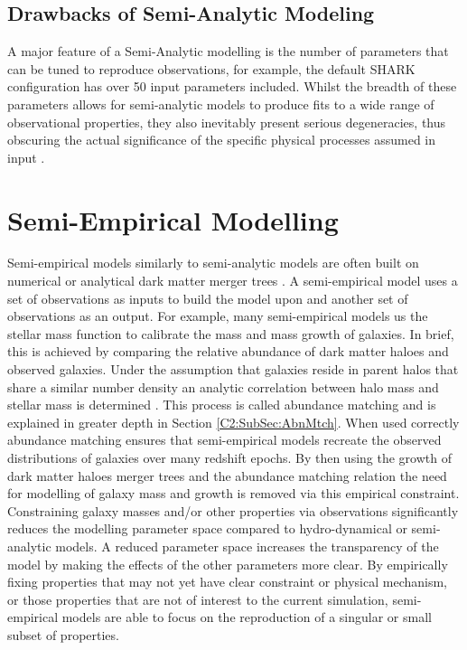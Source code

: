 \subsection{Drawbacks of Semi-Analytic Modeling}
A major feature of a Semi-Analytic modelling is the number of parameters that can be tuned to reproduce observations, for example, the default SHARK configuration has over 50 input parameters included. Whilst the breadth of these parameters allows for semi-analytic models to produce fits to a wide range of observational properties, they also inevitably present serious degeneracies, thus obscuring the actual significance of the specific physical processes assumed in input \citep{Lapi2011DarkModels,Gonzalez2011Evolution4}.


\section{Semi-Empirical Modelling}
\label{sec:SEM}
Semi-empirical models similarly to semi-analytic models are often built on numerical or analytical dark matter merger trees \cite{Zavala2012}. A semi-empirical model uses a set of observations as inputs to build the model upon and another set of observations as an output. 
For example, many semi-empirical models us the stellar mass function to calibrate the mass and mass growth of galaxies. In brief, this is achieved by comparing the relative abundance of dark matter haloes and observed galaxies. Under the assumption that galaxies reside in parent halos that share a similar number density an analytic correlation between halo mass and stellar mass is determined \citep{Kravtsov2004TheDistribution,Shankar2006NewFormation}. This process is called abundance matching and is explained in greater depth in Section \ref{C2:SubSec:AbnMtch}. When used correctly abundance matching ensures that semi-empirical models recreate the observed distributions of galaxies over many redshift epochs. By then using the growth of dark matter haloes merger trees and the abundance matching relation the need for modelling of galaxy mass and growth is removed via this empirical constraint. Constraining galaxy masses and/or other properties via observations significantly reduces the modelling parameter space compared to hydro-dynamical or semi-analytic models. A reduced parameter space increases the transparency of the model by making the effects of the other parameters more clear. By empirically fixing properties that may not yet have clear constraint or physical mechanism, or those properties that are not of interest to the current simulation, semi-empirical models are able to focus on the reproduction of a singular or small subset of properties.


